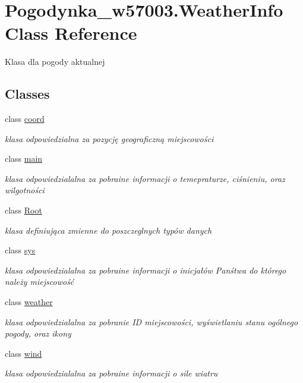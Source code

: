 \hypertarget{class_pogodynka__w57003_1_1_weather_info}{}\section{Pogodynka\+\_\+w57003.\+Weather\+Info Class Reference}
\label{class_pogodynka__w57003_1_1_weather_info}


Klasa dla pogody aktualnej  


\subsection*{Classes}
\begin{DoxyCompactItemize}
\item 
class \mbox{\hyperlink{class_pogodynka__w57003_1_1_weather_info_1_1coord}{coord}}
\begin{DoxyCompactList}\small\item\em klasa odpowiedzialna za pozycję geograficzną miejscowości \end{DoxyCompactList}\item 
class \mbox{\hyperlink{class_pogodynka__w57003_1_1_weather_info_1_1main}{main}}
\begin{DoxyCompactList}\small\item\em klasa odpowiedzialalna za pobraine informacji o temepraturze, ciśnieniu, oraz wilgotności \end{DoxyCompactList}\item 
class \mbox{\hyperlink{class_pogodynka__w57003_1_1_weather_info_1_1_root}{Root}}
\begin{DoxyCompactList}\small\item\em klasa definiująca zmienne do poszczeglnych typów danych \end{DoxyCompactList}\item 
class \mbox{\hyperlink{class_pogodynka__w57003_1_1_weather_info_1_1sys}{sys}}
\begin{DoxyCompactList}\small\item\em klasa odpowiedzialalna za pobraine informacji o inicjałów Panśtwa do którego należy miejscowość \end{DoxyCompactList}\item 
class \mbox{\hyperlink{class_pogodynka__w57003_1_1_weather_info_1_1weather}{weather}}
\begin{DoxyCompactList}\small\item\em klasa odpowiedzialalna za pobranie ID miejscowości, wyświetlaniu stanu ogólnego pogody, oraz ikony \end{DoxyCompactList}\item 
class \mbox{\hyperlink{class_pogodynka__w57003_1_1_weather_info_1_1wind}{wind}}
\begin{DoxyCompactList}\small\item\em klasa odpowiedzialalna za pobraine informacji o sile wiatru \end{DoxyCompactList}\end{DoxyCompactItemize}


